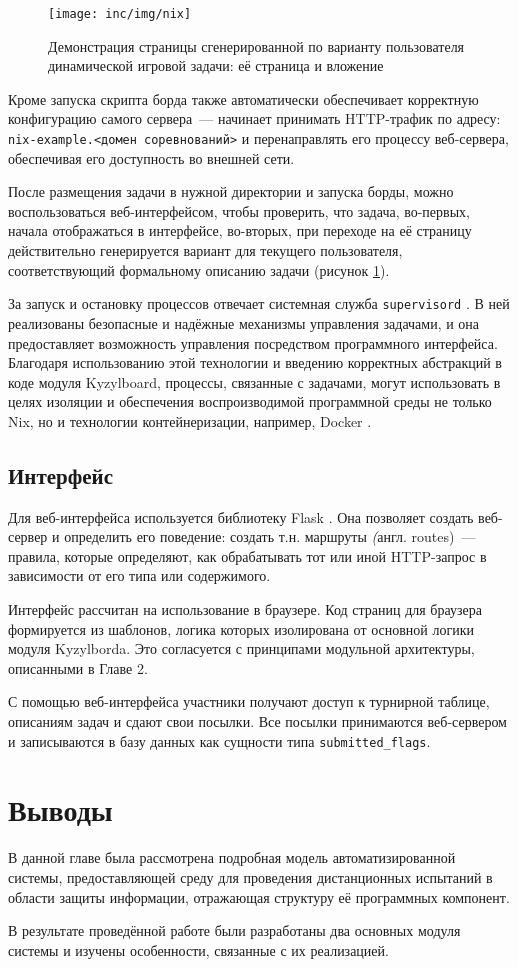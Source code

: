 \begin{figure}[h!]
  \centering
  \texttt{[image: inc/img/nix]}
  \caption{Демонстрация страницы сгенерированной по варианту пользователя динамической игровой задачи: её страница и вложение}
  \label{fig:nix}
\end{figure}

Кроме запуска скрипта борда также автоматически обеспечивает корректную конфигурацию самого сервера~--- начинает принимать HTTP-трафик по адресу: \texttt{nix-example.<домен соревнований>} и перенаправлять его процессу веб-сервера, обеспечивая его доступность во внешней сети.

После размещения задачи в нужной директории и запуска борды, можно воспользоваться веб-интерфейсом, чтобы проверить, что задача, во-первых, начала отображаться в интерфейсе, во-вторых, при переходе на её страницу действительно генерируется вариант для текущего пользователя, соответствующий формальному описанию задачи (рисунок \ref{fig:nix}).

За запуск и остановку процессов отвечает системная служба \texttt{supervisord} \cite{supervisord}. В ней реализованы безопасные и надёжные механизмы управления задачами, и она предоставляет возможность управления посредством программного интерфейса. Благодаря использованию этой технологии и введению корректных абстракций в коде модуля Kyzylboard, процессы, связанные с задачами, могут использовать в целях изоляции и обеспечения воспроизводимой программной среды не только Nix, но и технологии контейнеризации, например, Docker \cite{Docker}.


\subsection{Интерфейс}

Для веб-интерфейса используется библиотеку Flask \cite{Flask}. Она позволяет создать веб-сервер и определить его поведение: создать т.н. маршруты \textit(англ. routes)~--- правила, которые определяют, как обрабатывать тот или иной HTTP-запрос в зависимости от его типа или содержимого.

Интерфейс рассчитан на использование в браузере. Код страниц для браузера формируется из шаблонов, логика которых изолирована от основной логики модуля Kyzylborda. Это согласуется с принципами модульной архитектуры, описанными в Главе 2.

С помощью веб-интерфейса участники получают доступ к турнирной таблице, описаниям задач и сдают свои посылки. Все посылки принимаются веб-сервером и записываются в базу данных как сущности типа \texttt{submitted\_flags}.



\section{Выводы}

В данной главе была рассмотрена подробная модель автоматизированной системы, предоставляющей среду для проведения дистанционных испытаний в области защиты информации, отражающая структуру её программных компонент.

В результате проведённой работе были разработаны два основных модуля системы и изучены особенности, связанные с их реализацией.
